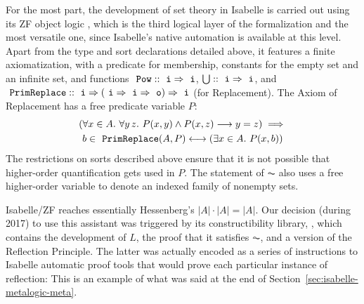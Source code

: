 For the most part, the development of set theory in Isabelle is
carried out using its ZF object logic
\cite{DBLP:journals/jar/PaulsonG96}, which is the third logical layer
of the formalization and the most versatile one, since 
Isabelle's native automation is available at this level. Apart from
the type and sort
declarations detailed above, it features a finite axiomatization,
with a predicate for membership, constants for the empty set and an
infinite set, and functions $\isatt{Pow}::\tyi\fun\tyi$,
$\union::\tyi\fun\tyi$, and $\isatt{PrimReplace} :: \tyi \fun (\tyi
\fun \tyi \fun\tyo)\fun \tyi$ (for Replacement). The Axiom of
Replacement
has a free predicate variable $P$: %
\begin{multline*}
  (\forall x \in A .\ \forall y\, z.\ P(x, y) \wedge P(x, z)
  \longrightarrow y=z) \implies \\
  b \in \isatt{PrimReplace}(A, P)
  \longleftrightarrow(\exists x \in A .\ P(x, b)) 
\end{multline*}
The restrictions on sorts described above ensure that it is not
possible that higher-order quantification gets used in $P$. The
statement of $\AC$ also uses a free higher-order variable to denote
an indexed family of nonempty sets. %

Isabelle/ZF reaches essentially Hessenberg's $|A|\cdot|A| = |A|$. Our decision
(during 2017) to
use this assistant was triggered by its constructibility
library,  \citep{paulson_2003},
which contains the development of $L$, the proof that it satisfies
$\AC$, and a version of the Reflection Principle. The latter was
actually encoded as a series of instructions to Isabelle automatic
proof tools that would prove each particular instance of reflection:
This is an example of what was said at the end of Section~\ref{sec:isabelle-metalogic-meta}.

